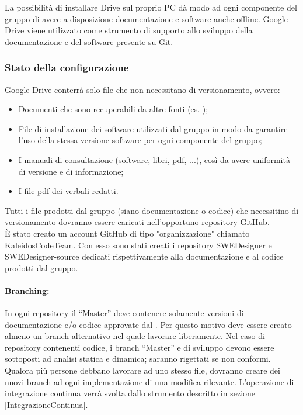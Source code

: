 \documentclass[../NormeDiProgetto.tex]{subfiles}
\begin{document}
				La possibilità di installare Drive sul proprio PC dà modo ad ogni componente del gruppo di
				avere a disposizione documentazione e software anche offline.
				Google Drive viene utilizzato come strumento di supporto allo sviluppo della
				documentazione e del software presente su Git.
			
			\subsubsection{Stato della configurazione}
				
				Google Drive conterrà solo file che non necessitano di versionamento, ovvero:
				\begin{itemize}
					\item Documenti che sono recuperabili da altre fonti (es. );
					\item File di installazione dei software utilizzati dal gruppo in modo da garantire l'uso della stessa versione software per ogni
					componente del gruppo;
					\item I manuali di consultazione (software, libri, pdf, ...), così da avere
					uniformità di versione e di informazione;
					\item I file pdf dei verbali redatti.
				\end{itemize}
				
				Tutti i file prodotti dal gruppo (siano documentazione o codice) che necessitino di versionamento dovranno essere caricati nell'opportuno repository GitHub.\\
			
				È stato creato un account GitHub di tipo "organizzazione" chiamato KaleidosCodeTeam. 
				Con esso sono stati creati i repository SWEDesigner e SWEDesigner-source dedicati rispettivamente alla documentazione e al codice prodotti dal gruppo.
				\paragraph{Branching:}						
					In ogni repository il  ``Master'' deve contenere solamente versioni di documentazione e/o
					codice approvate dal \responsabilediprogetto. Per questo motivo deve essere creato almeno un
					branch alternativo nel quale lavorare liberamente.
					Nel caso di repository contenenti codice, i branch ``Master'' e di sviluppo devono essere
					sottoposti ad analisi statica e dinamica; saranno rigettati se non conformi.
					Qualora più persone debbano lavorare ad uno stesso file, dovranno creare dei nuovi branch ad ogni
					implementazione di una modifica rilevante.
					L'operazione di integrazione continua verrà svolta dallo strumento descritto in sezione \ref{IntegrazioneContinua}.\\
					
\end{document}
